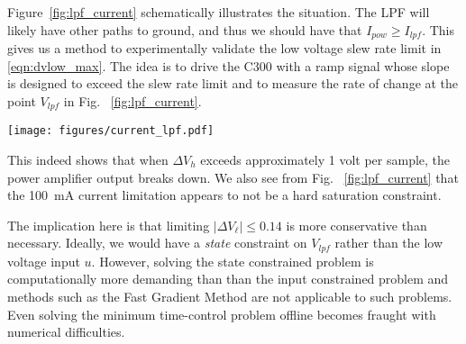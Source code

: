 \documentclass[journal,12pt,twocolumn,twoside]{IEEEtran/IEEEtran}
\begin{document}
Figure~\ref{fig:lpf_current} schematically illustrates the situation. The LPF will likely have other paths to ground, and thus we should have that $I_{pow} \geq I_{lpf}$. This gives us a method to experimentally validate the low voltage slew rate limit in \eqref{eqn:dvlow_max}. The idea is to drive the C300 with a ramp signal whose slope is designed to exceed the slew rate limit and to measure the rate of change at the point $V_{lpf}$ in Fig. ~\ref{fig:lpf_current}. 
\begin{figure*}
  \begin{minipage}{0.4\textwidth}
    \texttt{[image: figures/current\_lpf.pdf]}
    \caption{Schematic representation of  LPF.}
    \label{fig:lpf_current}
  \end{minipage}
\hfill
  \begin{minipage}{0.6\textwidth}
    
    \caption{Schematic representation of  LPF.}
    \label{fig:lpf_current}
  \end{minipage}
\end{figure*}
This indeed shows that when $\Delta V_h$ exceeds approximately 1 volt per sample, the power amplifier output breaks down. We also see from Fig. ~\ref{fig:lpf_current} that the 100~mA current limitation appears to not be a hard saturation constraint. 

The implication here is that limiting $|\Delta V_{\ell}|\leq 0.14$ is more conservative than necessary. Ideally, we would have a \emph{state} constraint on $V_{lpf}$ rather than the low voltage input $u$. However, solving the state constrained problem is computationally more demanding than than the input constrained problem and methods such as the Fast Gradient Method are not applicable to such problems. Even solving the minimum time-control problem offline becomes fraught with numerical difficulties. 

\end{document}
